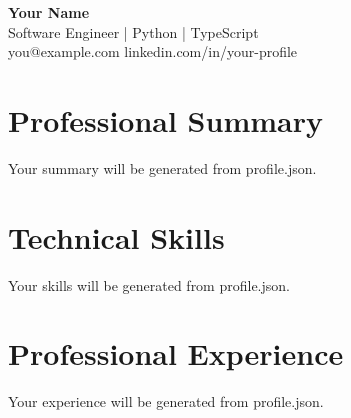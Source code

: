 \documentclass[10pt,letterpaper]{article}
\begin{document}
\begin{center}
  {\LARGE\bfseries Your Name}\\[3pt]
  {\large Software Engineer | Python | TypeScript}\\[4pt]
  you@example.com \textbar{} linkedin.com/in/your-profile
\end{center}
\section{Professional Summary}
Your summary will be generated from profile.json.
\section{Technical Skills}
Your skills will be generated from profile.json.
\section{Professional Experience}
Your experience will be generated from profile.json.
\end{document}
